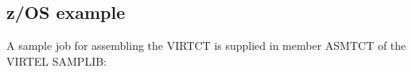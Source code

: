 \documentclass[letterpaper,10pt,english]{sphinxmanual}
\begin{document}
\subsection{z/OS example}
\label{\detokenize{Installation_Guide:z-os-example}}
A sample job for assembling the VIRTCT is supplied in member ASMTCT of the VIRTEL SAMPLIB:

\begin{sphinxVerbatim}[commandchars=\\\{\}]
  
       

\end{sphinxVerbatim}
\end{document}
